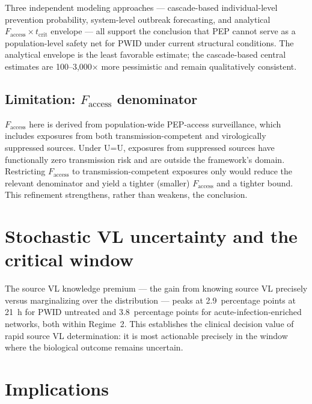 \documentclass[11pt]{article}
\theoremstyle{definition}
\theoremstyle{remark}
\newcommand{\Faccess}{F_{\text{access}}}
\newcommand{\tcrit}{t_{\text{crit}}}
\begin{document}
Three independent modeling approaches --- cascade-based individual-level prevention probability, system-level outbreak forecasting, and analytical $\Faccess \times \tcrit$ envelope --- all support the conclusion that PEP cannot serve as a population-level safety net for PWID under current structural conditions. The analytical envelope is the least favorable estimate; the cascade-based central estimates are 100--3{,}000$\times$ more pessimistic and remain qualitatively consistent.

\subsection*{Limitation: $\Faccess$ denominator}

$\Faccess$ here is derived from population-wide PEP-access surveillance, which includes exposures from both transmission-competent and virologically suppressed sources. Under U=U\cite{rodger2019,bavinton2018}, exposures from suppressed sources have functionally zero transmission risk and are outside the framework's domain. Restricting $\Faccess$ to transmission-competent exposures only would reduce the relevant denominator and yield a tighter (smaller) $\Faccess$ and a tighter bound. This refinement strengthens, rather than weakens, the conclusion.

\section*{Stochastic VL uncertainty and the critical window}

The source VL knowledge premium --- the gain from knowing source VL precisely versus marginalizing over the distribution --- peaks at 2.9~percentage points at 21~h for PWID untreated and 3.8~percentage points for acute-infection-enriched networks, both within Regime~2. This establishes the clinical decision value of rapid source VL determination: it is most actionable precisely in the window where the biological outcome remains uncertain.

\section*{Implications}
\end{document}
